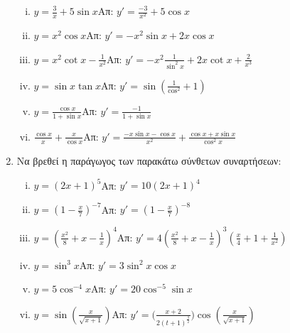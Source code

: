 \documentclass[a4paper,12pt]{article}
\begin{document}
\begin{enumerate}
\begin{enumerate}[i.]
\item $y=\frac{3}{x}+5\sin x$\hfill Απ: $y'=\frac{-3}{x^2}+5\cos x$
\item $y=x^2\cos x$\hfill Απ: $y'=-x^2\sin x+2x\cos x$
\item $y=x^2\cot x -\frac{1}{x^2}$\hfill Απ: $y'=-x^2\frac{1}{\sin^2 x}+2x\cot x+\frac{2}{x^3}$
\item $y=\sin x \tan x$\hfill Απ: $y'=\sin(\frac{1}{\cos^2}+1)$
\item $y=\frac{\cos x}{1+\sin x}$\hfill Απ: $y'=\frac{-1}{1+\sin x}$
\item $\frac{\cos x}{x}+\frac{x}{\cos x}$\hfill Απ: $y'=\frac{-x\sin x-\cos x}{x^2}+\frac{\cos x+x\sin x}{\cos^2 x}$
\end{enumerate}

\newpage

\item Να βρεθεί η παράγωγος των παρακάτω σύνθετων συναρτήσεων:

\begin{enumerate}[i.]
\item $y=(2x+1)^5$\hfill Απ: $y'=10(2x+1)^4$
\item $y=(1-\frac{x}{7})^{-7}$\hfill Απ: $y'=(1-\frac{x}{7})^{-8}$
\item $y=\left(\frac{x^2}{8}+x-\frac{1}{x}\right)^4$\hfill Απ: $y'=4\left(\frac{x^2}{8}+x-\frac{1}{x}\right)^3\left(\frac{x}{4}+1+\frac{1}{x^2}\right)$
\item $y=\sin^3 x$\hfill Απ: $y'=3\sin^2x \cos x$
\item $y=5\cos^{-4}x$\hfill Απ: $y'=20\cos^{-5}\sin x$
\item $y=\sin\left(\frac{x}{\sqrt{x+1}}\right)$\hfill Απ: $y'=\biggl(\frac{x+2}{2(t+1)^{\frac{3}{2}}}\biggr)\cos\left(\frac{x}{\sqrt{x+1}}\right)$
\end{enumerate}



\end{enumerate}
\end{document}
